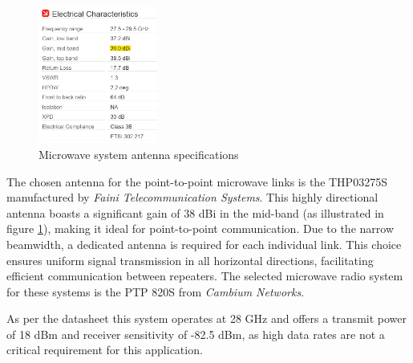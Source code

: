 \begin{figure}
    \vspace{-10mm}
    \centering
    \includegraphics[width=0.35\textwidth]{Images/Antenna THP 03 275 S TX.jpg}
    \caption{\small Microwave system antenna specifications}
    \label{fig:uW_Ant}
\end{figure}

The chosen antenna for the point-to-point microwave links is the THP03275S manufactured by \textit{Faini Telecommunication Systems}\cite{THP03275S}.
This highly directional antenna boasts a significant gain of 38 dBi in the mid-band (as illustrated in figure \ref{fig:uW_Ant}), making it ideal for point-to-point communication.
Due to the narrow beamwidth, a dedicated antenna is required for each individual link.
This choice ensures uniform signal transmission in all horizontal directions, facilitating efficient communication between repeaters.
The selected microwave radio system for these systems is the PTP 820S from \textit{Cambium Networks}.

\vspace{5mm}
As per the datasheet this system operates at 28 GHz and offers a transmit power of 18 dBm and receiver sensitivity of -82.5 dBm,\cite{PTP820S} as high data rates are not a critical requirement for this application.

